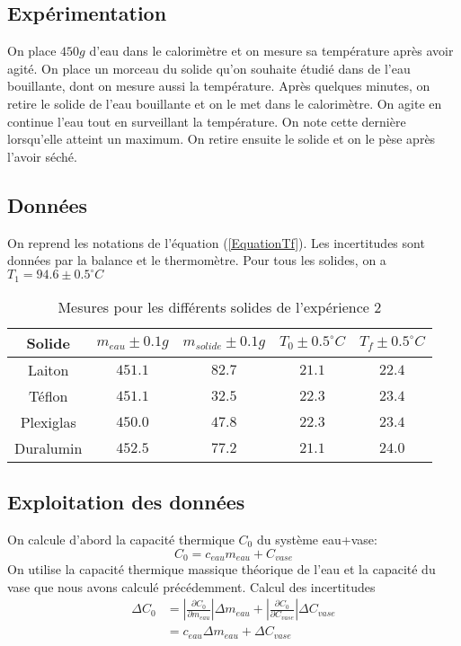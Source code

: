 \documentclass[12pt]{article}
\begin{document}
\subsection{Expérimentation}
On place $450g$ d'eau dans le calorimètre et on mesure sa température après avoir agité. On place un morceau du solide qu'on souhaite étudié dans de l'eau bouillante, dont on mesure aussi la température. Après quelques minutes, on retire le solide de l'eau bouillante et on le met dans le calorimètre. On agite en continue l'eau tout en surveillant la température. On note cette dernière lorsqu'elle atteint un maximum. On retire ensuite le solide et on le pèse après l'avoir séché.

\subsection{Données}
On reprend les notations de l'équation (\ref{EquationTf}). Les incertitudes sont données par la balance et le thermomètre. Pour tous les solides, on a $T_1=94.6\pm 0.5^{\circ}C$
\begin{table}[h!]
	\begin{center}
		\begin{tabular}{|c|c|c|c|c|}
		\hline
		Solide & $m_{eau} \pm 0.1g$ & $m_{solide}\pm 0.1g$ & $T_0\pm 0.5^{\circ}C$ & $T_f\pm 0.5^{\circ}C$\\ \hline
		Laiton & $451.1$ & $82.7$ & $21.1$ & $22.4$ \\
		Téflon & $451.1$ & $32.5$ & $22.3$ & $23.4$ \\
		Plexiglas & $450.0$ & $47.8$ & $22.3$ & $23.4$ \\
		Duralumin & $452.5$ & $77.2$ & $21.1$ & $24.0$ \\ \hline
		\end{tabular}
		\caption{Mesures pour les différents solides de l'expérience 2}
		\label{table:mesureexp2}
	\end{center}
\end{table}

\subsection{Exploitation des données}
On calcule d'abord la capacité thermique $C_0$ du système eau+vase:
\begin{equation}
C_0=c_{eau}m_{eau}+C_{vase}
\end{equation}
On utilise la capacité thermique massique théorique de l'eau et la capacité du vase que nous avons calculé précédemment. Calcul des incertitudes
\begin{align*}
\Delta C_0&=\displaystyle\left\lvert \frac{\partial C_0}{\partial m_{eau}}\right\rvert \Delta m_{eau} + \displaystyle\left\lvert \frac{\partial C_0}{\partial C_{vase}}\right\rvert \Delta C_{vase}\\
&=c_{eau}\Delta m_{eau}+\Delta C_{vase}
\end{align*}
\end{document}

